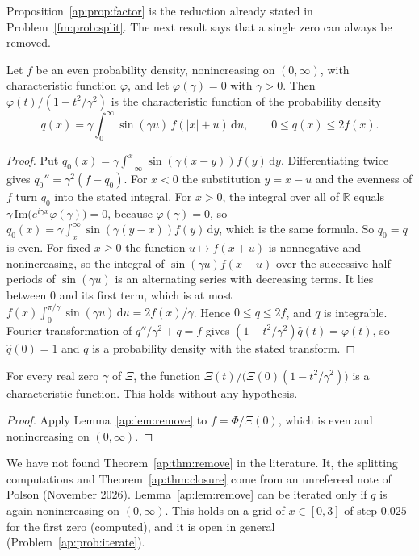 Proposition~\ref{ap:prop:factor} is the reduction already stated in Problem~\ref{fm:prob:split}. The next result says that a single zero can always be removed.

\begin{lemma}\label{ap:lem:remove}
Let $f$ be an even probability density, nonincreasing on $(0,\infty)$, with characteristic function $\varphi$, and let $\varphi(\gamma)=0$ with $\gamma>0$. Then $\varphi(t)/(1-t^2/\gamma^2)$ is the characteristic function of the probability density
\[
q(x)=\gamma\int_0^\infty\sin(\gamma u)\,f(|x|+u)\,\mathrm du,\qquad0\le q(x)\le2f(x).
\]
\end{lemma}

\begin{proof}
Put $q_0(x)=\gamma\int_{-\infty}^x\sin(\gamma(x-y))f(y)\,\mathrm dy$. Differentiating twice gives $q_0''=\gamma^2(f-q_0)$. For $x<0$ the substitution $y=x-u$ and the evenness of $f$ turn $q_0$ into the stated integral. For $x>0$, the integral over all of $\mathbb R$ equals $\gamma\,\mathrm{Im}\big(e^{i\gamma x}\varphi(\gamma)\big)=0$, because $\varphi(\gamma)=0$, so $q_0(x)=\gamma\int_x^\infty\sin(\gamma(y-x))f(y)\,\mathrm dy$, which is the same formula. So $q_0=q$ is even. For fixed $x\ge0$ the function $u\mapsto f(x+u)$ is nonnegative and nonincreasing, so the integral of $\sin(\gamma u)f(x+u)$ over the successive half periods of $\sin(\gamma u)$ is an alternating series with decreasing terms. It lies between $0$ and its first term, which is at most $f(x)\int_0^{\pi/\gamma}\sin(\gamma u)\,\mathrm du=2f(x)/\gamma$. Hence $0\le q\le2f$, and $q$ is integrable. Fourier transformation of $q''/\gamma^2+q=f$ gives $(1-t^2/\gamma^2)\hat q(t)=\varphi(t)$, so $\hat q(0)=1$ and $q$ is a probability density with the stated transform.
\end{proof}

\begin{theorem}\label{ap:thm:remove}
For every real zero $\gamma$ of $\Xi$, the function $\Xi(t)/\big(\Xi(0)(1-t^2/\gamma^2)\big)$ is a characteristic function. This holds without any hypothesis.
\end{theorem}

\begin{proof}
Apply Lemma~\ref{ap:lem:remove} to $f=\Phi/\Xi(0)$, which is even and nonincreasing on $(0,\infty)$.
\end{proof}

We have not found Theorem~\ref{ap:thm:remove} in the literature. It, the splitting computations and Theorem~\ref{ap:thm:closure} come from an unrefereed note of Polson (November 2026). Lemma~\ref{ap:lem:remove} can be iterated only if $q$ is again nonincreasing on $(0,\infty)$. This holds on a grid of $x\in[0,3]$ of step $0.025$ for the first zero (computed), and it is open in general (Problem~\ref{ap:prob:iterate}).

